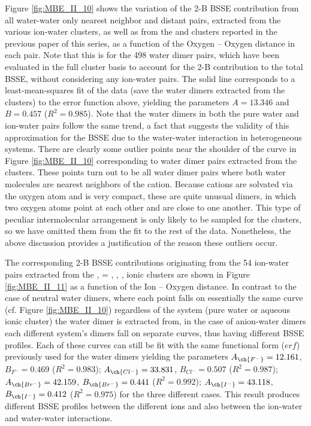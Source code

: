 \documentclass[11pt, proquest]{uwthesis}[2020/02/24]
\let\ce\ch
\begin{document}
\par Figure \ref{fig:MBE_II_10} shows the variation of the 2-B BSSE contribution from all water-water only nearest neighbor and distant pairs, extracted from the various ion-water clusters, as well as from the \ce{(H2O)7} and \ce{(H2O)_{10}} clusters reported in the previous paper of this series,\autocite{heindel_many-body_2020} as a function of the Oxygen – Oxygen distance in each pair. Note that this is for the 498 water dimer pairs, which have been evaluated in the full cluster basis to account for the 2-B contribution to the total BSSE, without considering any ion-water pairs. The solid line corresponds to a least-mean-squares fit of the data (save the water dimers extracted from the \ce{Li^+(H2O)9} clusters) to the error function above, yielding the parameters $A = 13.346$ and $B = 0.457$ ($R^2 = 0.985$). Note that the water dimers in both the pure water and ion-water pairs follow the same trend, a fact that suggests the validity of this approximation for the BSSE due to the water-water interaction in heterogeneous systems. There are clearly some outlier points near the shoulder of the curve in Figure \ref{fig:MBE_II_10} corresponding to water dimer pairs extracted from the \ce{Li^+(H2O)9} clusters. These points turn out to be all water dimer pairs where both water molecules are nearest neighbors of the \ce{Li^+} cation. Because cations are solvated via the oxygen atom and \ce{Li^+} is very compact, these are quite unusual dimers, in which two oxygen atoms point at each other and are close to one another. This type of peculiar intermolecular arrangement is only likely to be sampled for the \ce{Li^+(H2O)9} clusters, so we have omitted them from the fit to the rest of the data. Nonetheless, the above discussion provides a justification of the reason these outliers occur.

\par The corresponding 2-B BSSE contributions originating from the 54 ion-water pairs extracted from the \ce{Z^-(H2O)9}, \ce{Z} = \ce{Cl^-}, \ce{Br^-}, \ce{I^-}, ionic clusters are shown in Figure \ref{fig:MBE_II_11} as a function of the Ion – Oxygen distance. In contrast to the case of neutral water dimers, where each point falls on essentially the same curve (cf. Figure \ref{fig:MBE_II_10}) regardless of the system (pure water or aqueous ionic cluster) the water dimer is extracted from, in the case of anion-water dimers each different system’s dimers fall on separate curves, thus having different BSSE profiles. Each of these curves can still be fit with the same functional form ($erf$) previously used for the water dimers yielding the parameters $A_{\ce{F^-}}=12.161$, $B_{F^-}=0.469$ ($R^2=0.983$); $A_{\ce{Cl^-}}=33.831$, $B_{Cl^-}=0.507$ ($R^2 = 0.987$); $A_{\ce{Br^-}}=42.159$, $B_{\ce{Br^-}}=0.441$ ($R^2 = 0.992$); $A_{\ce{I^-}}=43.118$, $B_{\ce{I^-}}=0.412$ ($R^2 = 0.975$) for the three different cases. This result produces different BSSE profiles between the different ions and also between the ion-water and water-water interactions.
\end{document}
